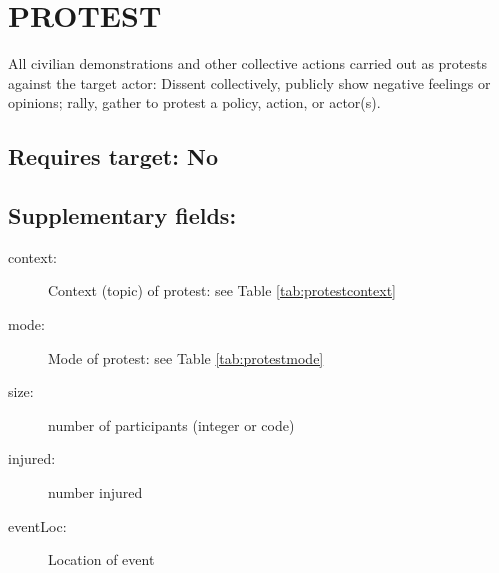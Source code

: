 \documentclass[11pt]{report}
\begin{document}
\newpage  


\section{PROTEST}

All civilian demonstrations and other collective actions carried out as protests against the target actor: Dissent collectively, publicly show negative feelings or opinions; rally, gather to protest a policy, action, or actor(s).

\subsection{Requires target: No}

\subsection{Supplementary fields:}

\begin{description}
    \item[context:] Context (topic) of protest: see Table \ref{tab:protestcontext} 
    \item[mode:] Mode of protest: see Table \ref{tab:protestmode} 
    \item[size:]  number of participants (integer or code) 
    \item[injured:] number injured 
    \item[eventLoc:] Location of event 
\end{description}
\end{document}
